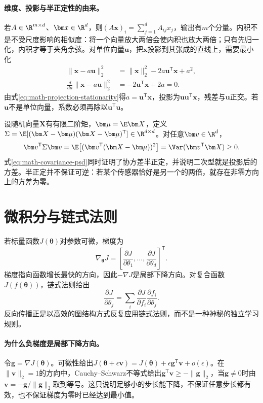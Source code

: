 \paragraph{维度、投影与半正定性的由来。}
若$A\in\R^{m\times d}$、$\bm x\in\R^d$，则$(A\bm x)_i=\sum_{j=1}^d A_{ij}x_j$，输出有$m$个分量。内积不是不受尺度影响的相似度：将一个向量放大两倍会使内积也放大两倍；只有先归一化，内积才等于夹角余弦。对单位向量$\bm u$，把$\bm x$投影到其张成的直线上，需要最小化
\begin{align}
 \|\bm x-a\bm u\|_2^2
 &=\|\bm x\|_2^2-2a\bm u^{\mathsf T}\bm x+a^2,\\
 \frac{d}{da}\|\bm x-a\bm u\|_2^2&=-2\bm u^{\mathsf T}\bm x+2a=0.\label{eq:math-projection-stationarity}
\end{align}
由式\eqref{eq:math-projection-stationarity}得$a=\bm u^{\mathsf T}\bm x$，投影为$\bm u\bm u^{\mathsf T}\bm x$，残差与$\bm u$正交。若$\bm u$不是单位向量，系数必须再除以$\bm u^{\mathsf T}\bm u$。

设随机向量$\bm X$有有限二阶矩，$\bm\mu=\E\bm X$，定义$\Sigma=\E[(\bm X-\bm\mu)(\bm X-\bm\mu)^{\mathsf T}]\in\R^{d\times d}$。对任意$\bm v\in\R^d$，
\begin{equation}
 \bm v^{\mathsf T}\Sigma\bm v
 =\E\bigl[(\bm v^{\mathsf T}(\bm X-\bm\mu))^2\bigr]
 =\Var(\bm v^{\mathsf T}\bm X)\geq0.\label{eq:math-covariance-psd}
\end{equation}
式\eqref{eq:math-covariance-psd}同时证明了协方差半正定，并说明二次型就是投影后的方差。半正定并不保证可逆：若某个传感器恰好是另一个的两倍，就存在非零方向上的方差为零。

\section{微积分与链式法则}
若标量函数$J(\bm{\theta})$对参数可微，梯度为
\begin{equation}
 \nabla_{\bm{\theta}}J=\left[\frac{\partial J}{\partial\theta_1},\ldots,\frac{\partial J}{\partial\theta_d}\right]^{\mathsf T}.
\end{equation}
梯度指向函数增长最快的方向，因此$-\nabla J$是局部下降方向。对复合函数$J(f(\bm{\theta}))$，链式法则给出
\begin{equation}
 \frac{\partial J}{\partial\theta_j}=\sum_i\frac{\partial J}{\partial f_i}\frac{\partial f_i}{\partial\theta_j}.
\end{equation}
反向传播正是以高效的图结构方式反复应用链式法则，而不是一种神秘的独立学习规则。

\paragraph{为什么负梯度是局部下降方向。}
令$\bm g=\nabla J(\bm\theta)$。可微性给出$J(\bm\theta+\epsilon\bm v)=J(\bm\theta)+\epsilon\bm g^{\mathsf T}\bm v+o(\epsilon)$。在$\|\bm v\|_2=1$的方向中，Cauchy--Schwarz不等式给出$\bm g^{\mathsf T}\bm v\geq-\|\bm g\|_2$，当$\bm g\ne0$时由$\bm v=-\bm g/\|\bm g\|_2$取到等号。这只说明足够小的步长能下降，不保证任意步长都有效，也不保证梯度为零时已经达到最小值。

